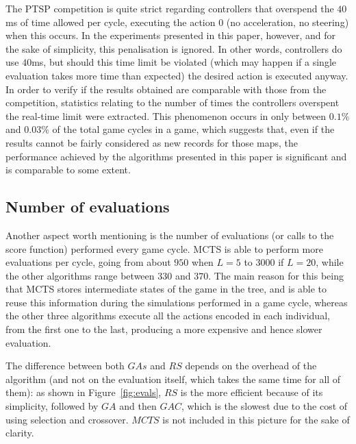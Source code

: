 \documentclass{sig-alternate}
\begin{document}
The PTSP competition is quite strict regarding controllers that overspend the $40$ ms of time allowed per cycle, executing the action 0 (no acceleration, no steering) when this occurs. In the experiments presented in this paper, however, and for the sake of simplicity, this penalisation is ignored. In other words, controllers do use $40$ms, but should this time limit be violated (which may happen if a single evaluation takes more time than expected) the desired action is executed anyway. In order to verify if the results obtained are comparable with those from the competition, statistics relating to the number of times the controllers overspent the real-time limit were extracted. This phenomenon occurs in only between $0.1\%$ and $0.03\%$ of the total game cycles in a game, which suggests that, even if the results cannot be fairly considered as new records for those maps, the performance achieved by the algorithms presented in this paper is significant and is comparable to some extent.

\subsection{Number of evaluations} \label{sec:eval}

Another aspect worth mentioning is the number of evaluations (or calls to the score function) performed every game cycle.  MCTS is able to perform more evaluations per cycle, going from about $950$ when $L=5$ to $3000$ if $L=20$, while the other algorithms range between $330$ and $370$. The main reason for this being that MCTS stores intermediate states of the game in the tree, and is able to reuse this information during the simulations performed in a game cycle, whereas the other three algorithms execute all the actions encoded in each individual, from the first one to the last, producing a more expensive and hence slower evaluation.

The difference between both $GAs$ and $RS$ depends on the overhead of the algorithm (and not on the evaluation itself, which takes the same time for all of them): as shown in Figure~\ref{fig:evals}, $RS$ is the more efficient because of its simplicity, followed by $GA$ and then $GAC$, which is the slowest due to the cost of using selection and crossover. $MCTS$ is not included in this picture for the sake of clarity.
\end{document}
